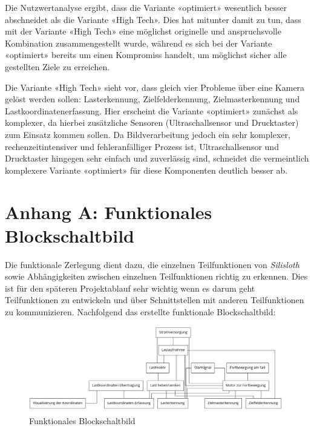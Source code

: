 \documentclass[a4paper,11pt]{scrartcl}
\begin{document}
Die Nutzwertanalyse ergibt, dass die Variante «optimiert» wesentlich besser abschneidet als die Variante «High Tech». Dies hat mitunter damit zu tun, dass mit der Variante «High Tech» eine möglichst originelle und anspruchsvolle Kombination zusammengestellt wurde, während es sich bei der Variante «optimiert» bereits um einen Kompromiss handelt, um möglichst sicher alle gestellten Ziele zu erreichen. 

Die Variante «High Tech» sieht vor, dass gleich vier Probleme über eine Kamera gelöst werden sollen: Lasterkennung, Zielfelderkennung, Zielmasterkennung und Lastkoordinatenerfassung. Hier erscheint die Variante «optimiert» zunächst als komplexer, da hierbei zusätzliche Sensoren (Ultraschallsensor und Drucktaster) zum Einsatz kommen sollen. Da Bildverarbeitung jedoch ein sehr komplexer, rechenzeitintensiver und fehleranfälliger Prozess ist, Ultraschallsensor und Drucktaster hingegen sehr einfach und zuverlässig sind, schneidet die vermeintlich komplexere Variante «optimiert» für diese Komponenten deutlich besser ab.

\newpage

\section{Anhang A: Funktionales Blockschaltbild}
\label{lbl:FunktionalesBlockschaltbild}

Die funktionale Zerlegung dient dazu, die einzelnen Teilfunktionen von \textit{Silisloth} sowie Abhängigkeiten zwischen einzelnen Teilfunktionen richtig zu erkennen. Dies ist für den späteren Projektablauf sehr wichtig wenn es darum geht Teilfunktionen zu entwickeln und über Schnittstellen mit anderen Teilfunktionen zu kommunizieren. Nachfolgend das erstellte funktionale Blockschaltbild:

\begin{figure}[H]
    \includegraphics[width=\linewidth]{blockschaltbild.png}
    \caption{Funktionales Blockschaltbild}
    \label{fig:blockschaltbild}
\end{figure}
\end{document}
